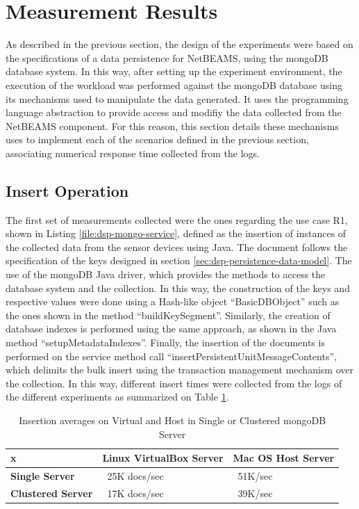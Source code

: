 \section{Measurement Results}
\label{sec:exp-measurements}

As described in the previous section, the design of the experiments were based
on the specifications of a data persistence for NetBEAMS, using the mongoDB
database system. In this way, after setting up the experiment environment,
the execution of the workload was performed against the mongoDB database using
its mechanisms used to manipulate the data generated. It uses the programming
language abstraction to provide access and modifiy the data collected from the
NetBEAMS component. For this reason, this section details these mechanisms uses
to implement each of the scenarios defined in the previous section, associating
numerical response time collected from the logs.

\subsection{Insert Operation}

The first set of measurements collected were the ones regarding the use case
R1, shown in Listing \ref{file:dsp-mongo-service}, defined as the insertion of
instances of the collected data from the sensor devices using Java. The
document follows the specification of the keys designed in section
\ref{sec:dsp-persistence-data-model}. The use of the mongoDB Java driver, which
provides the methods to access the database system and the collection. In this
way, the construction of the keys and respective values were done using a
Hash-like object ``BasicDBObject'' such as the ones shown in the method
``buildKeySegment''. Similarly, the creation of database indexes is performed
using the same approach, as shown in the Java method ``setupMetadataIndexes''.
Finally, the insertion of the documents is performed on the service method
call ``insertPersistentUnitMessageContents'', which delimits the bulk insert
using the transaction management mechanism over the collection. In this way,
different insert times were collected from the logs of the different
experiments as summarized on Table \ref{tab:experiment-insert-avarage}.

\begin{table}
    \begin{center}
        \begin{tabular}{|p{100pt}|p{100pt}|p{100pt}|}\hline
           x & \textbf{Linux VirtualBox Server} & \textbf{Mac OS Host Server}\\\hline 
           \textbf{Single Server} & ~25K docs/sec & ~51K/sec \\\hline
           \textbf{Clustered Server} & ~17K docs/sec & ~39K/sec \\\hline
        \end{tabular}
        \caption{Insertion averages on Virtual and Host in Single or Clustered
        mongoDB Server}
    \end{center}
    \label{tab:experiment-insert-avarage}
\end{table}

